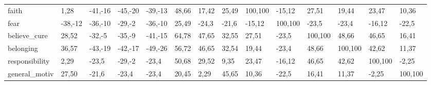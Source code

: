 \begin{sidewaystable}[H]
\begin{tabular} {|l|l|l|l|l|l|l|l|l|l|l|l|l|l|}
 faith & {\color{green}1,28} & {\color{red}-41,-16} & {\color{red}-45,-20} & {\color{red}-39,-13} & {\color{green}48,66} & {\color{green}17,42} & {\color{green}25,49} & {\color{green}100,100} & -15,12 & {\color{green}27,51} & {\color{green}19,44} & {\color{green}23,47} & {\color{green}10,36} \\ 
 fear & {\color{red}-38,-12} & {\color{red}-36,-10} & {\color{red}-29,-2} & {\color{red}-36,-10} & {\color{green}25,49} & -24,3 & -21,6 & -15,12 & {\color{green}100,100} & -23,5 & -23,4 & -16,12 & -22,5 \\ 
 believe_cure & {\color{green}28,52} & {\color{red}-32,-5} & {\color{red}-35,-9} & {\color{red}-41,-15} & {\color{green}64,78} & {\color{green}47,65} & {\color{green}32,55} & {\color{green}27,51} & -23,5 & {\color{green}100,100} & {\color{green}48,66} & {\color{green}46,65} & {\color{green}16,41} \\ 
 belonging & {\color{green}36,57} & {\color{red}-43,-19} & {\color{red}-42,-17} & {\color{red}-49,-26} & {\color{green}56,72} & {\color{green}46,65} & {\color{green}32,54} & {\color{green}19,44} & -23,4 & {\color{green}48,66} & {\color{green}100,100} & {\color{green}42,62} & {\color{green}11,37} \\ 
 responsibility & {\color{green}2,29} & -23,5 & {\color{red}-29,-2} & -23,4 & {\color{green}50,68} & {\color{green}29,52} & {\color{green}9,35} & {\color{green}23,47} & -16,12 & {\color{green}46,65} & {\color{green}42,62} & {\color{green}100,100} & -2,25 \\ 
 general_motiv & {\color{green}27,50} & -21,6 & -23,4 & -23,4 & {\color{green}20,45} & {\color{green}2,29} & {\color{green}45,65} & {\color{green}10,36} & -22,5 & {\color{green}16,41} & {\color{green}11,37} & -2,25 & {\color{green}100,100} \\ 
 \hline 
 \end{tabular} 
\end{sidewaystable} 
